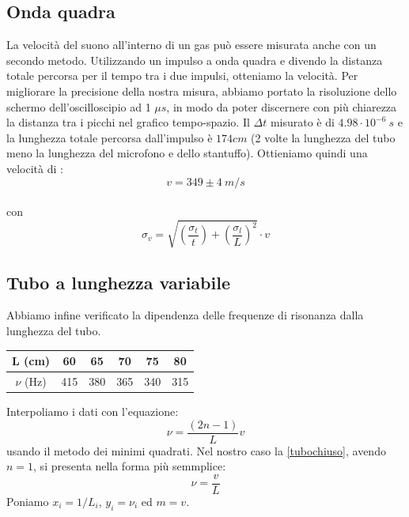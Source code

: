 \subsection{Onda quadra}
La velocità del suono all'interno di un gas può essere misurata anche con un secondo metodo. Utilizzando un impulso a onda quadra e divendo la distanza totale percorsa per il tempo tra i due impulsi, otteniamo la velocità.  Per migliorare la precisione della nostra misura, abbiamo portato la risoluzione dello schermo dell'oscilloscipio ad 1 $\mu s$, in modo da poter discernere con più chiarezza la distanza tra i picchi nel grafico tempo-spazio.
Il $\Delta t$ misurato è di $4.98 \cdot 10^{-6} \ s$ e la lunghezza totale percorsa dall'impulso è $174 cm$ (2 volte la lunghezza del tubo meno la lunghezza del microfono e dello stantuffo). Ottieniamo quindi una velocità di :
$$v = 349 \pm 4 \ m/s$$
\\
con $$\sigma_v=\sqrt{\left(\frac{\sigma_t}{t}\right)+\left(\frac{\sigma_l}{L} \right)^2} \cdot v$$

\subsection{Tubo a lunghezza variabile}
Abbiamo infine verificato la dipendenza delle frequenze di risonanza dalla lunghezza del tubo.

\begin{center}
\begin{tabular}{*{5}{c|}c}
L (cm) & 60 & 65 & 70 & 75 & 80 \\
\midrule
$\nu$ (Hz) &415 & 380 & 365 & 340 & 315\\
\end{tabular}
\end{center}
Interpoliamo i dati con l'equazione:
\begin{equation}\label{tubochiuso}
\nu=\frac{(2n-1)}{L}v
\end{equation} 
usando il metodo dei minimi quadrati. Nel nostro caso la \ref{tubochiuso}, avendo $n=1$, si presenta nella forma più semmplice:
$$\nu=\frac{v}{L}$$
Poniamo $x_i=1/L_i$, $y_i=\nu_i$ ed $m=v$.

